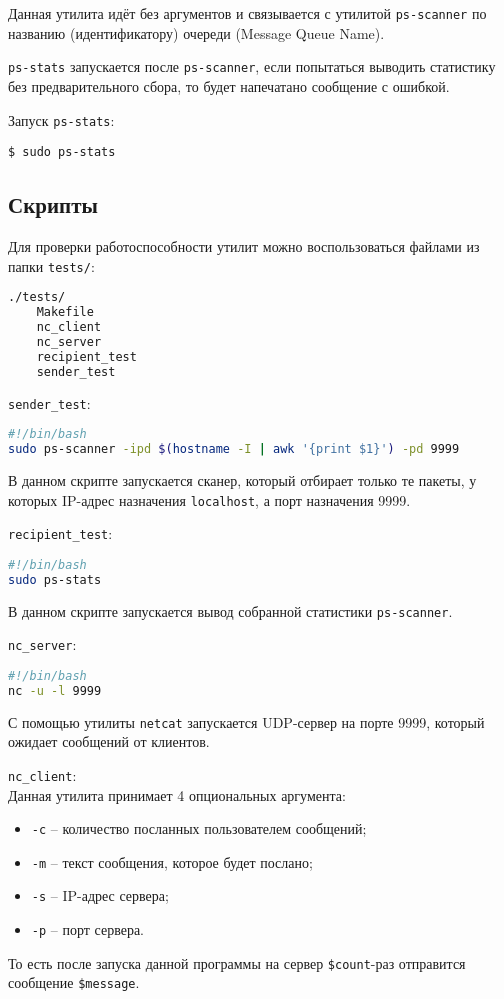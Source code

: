 Данная утилита идёт без аргументов и связывается с утилитой \verb|ps-scanner| по названию (идентификатору) очереди (Message Queue Name).

\verb|ps-stats| запускается после \verb|ps-scanner|, если попытаться выводить статистику без предварительного сбора, то будет напечатано сообщение с ошибкой.

\linespace

Запуск \verb|ps-stats|:
\begin{lstlisting}
$ sudo ps-stats
\end{lstlisting}

\subsection{Скрипты}

Для проверки работоспособности утилит можно воспользоваться файлами из папки \verb|tests/|:

\begin{lstlisting}[language=bash]
./tests/
    Makefile
    nc_client
    nc_server
    recipient_test
    sender_test
\end{lstlisting}

\linespace

\verb|sender_test|:
\begin{lstlisting}[language=bash]
#!/bin/bash
sudo ps-scanner -ipd $(hostname -I | awk '{print $1}') -pd 9999
\end{lstlisting}
В данном скрипте запускается сканер, который отбирает только те пакеты, у которых IP-адрес назначения \verb|localhost|, а порт назначения 9999.

\newpage

\verb|recipient_test|:
\begin{lstlisting}[language=bash]
#!/bin/bash
sudo ps-stats
\end{lstlisting}
В данном скрипте запускается вывод собранной статистики \verb|ps-scanner|.

\linespace

\verb|nc_server|:
\begin{lstlisting}[language=bash]
#!/bin/bash
nc -u -l 9999
\end{lstlisting}
С помощью утилиты \verb|netcat| запускается UDP-сервер на порте 9999, который ожидает сообщений от клиентов.

\linespace

\verb|nc_client|:\\
Данная утилита принимает 4 опциональных аргумента:
\begin{itemize}
    \item \verb|-c| -- количество посланных пользователем сообщений;
    \item \verb|-m| -- текст сообщения, которое будет послано;
    \item \verb|-s| -- IP-адрес сервера;
    \item \verb|-p| -- порт сервера.
\end{itemize}
То есть после запуска данной программы на сервер \verb|$count|-раз отправится сообщение \verb|$message|.

